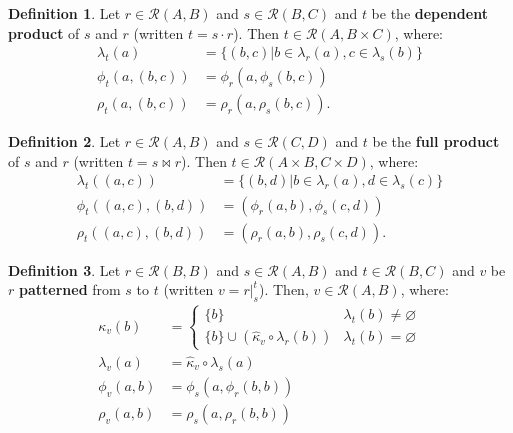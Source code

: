 \documentclass{article}
\theoremstyle{definition}
\newtheorem{definition}{Definition}[subsection]
\theoremstyle{plain}
\def\rule{\mathcal{R}}
\begin{document}
\begin{definition}
  Let $ r \in \rule (A, B) $
  and $ s \in \rule (B, C) $
  and $ t $ be the \textbf{dependent product} of $ s $ and $ r $
  (written $ t = s \cdot r $).
  Then $ t \in \rule (A, B \times C) $, where:
  \begin{align}
    \lambda_t (a)         & = \{ (b, c) | b \in \lambda_r (a), c \in \lambda_s (b) \} \\
       \phi_t (a, (b, c)) & =    \phi_r (a, \phi_s (b, c)) \\
       \rho_t (a, (b, c)) & =    \rho_r (a, \rho_s (b, c)).
  \end{align}
\end{definition}

\begin{definition}
  Let $ r \in \rule (A, B) $
  and $ s \in \rule (C, D) $
  and $ t $ be the \textbf{full product} of $ s $ and $ r $
  (written $ t = s \bowtie r $).
  Then $ t \in \rule (A \times B, C \times D) $, where:
  \begin{align}
    \lambda_t ((a, c))         & = \{ (b, d) | b \in \lambda_r (a), d \in \lambda_s (c) \} \\
       \phi_t ((a, c), (b, d)) & = (\phi_r (a, b), \phi_s (c, d)) \\
       \rho_t ((a, c), (b, d)) & = (\rho_r (a, b), \rho_s (c, d)).
  \end{align}
\end{definition}

\begin{definition}
  Let $ r \in \rule (B, B) $
  and $ s \in \rule (A, B) $
  and $ t \in \rule (B, C) $
  and $ v $ be $ r $ \textbf{patterned} from $ s $ to $ t $
  (written $ v = r \rvert_{s}^{t} $).
  Then, $ v \in \rule (A, B) $, where:
  \begin{align}
      \kappa_v (b) & = \begin{cases}
                         \{ b \}                                               & \lambda_t (b) \neq \varnothing \\
                         \{ b \} \cup (\widehat{\kappa}_v \circ \lambda_r (b)) & \lambda_t (b) =    \varnothing
                       \end{cases} \\
  \lambda_v (a)    & = \widehat{\kappa}_v \circ \lambda_s (a) \\
     \phi_v (a, b) & = \phi_s (a, \phi_r (b, b)) \\
     \rho_v (a, b) & = \rho_s (a, \rho_r (b, b)) 
  \end{align}
\end{definition}
\end{document}
